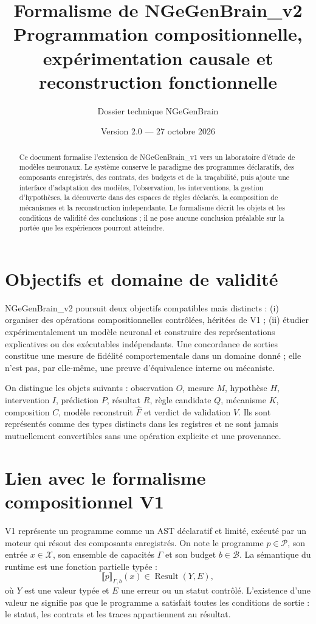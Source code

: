\documentclass[11pt,a4paper]{article}
\title{Formalisme de NGeGenBrain\_v2\\\large Programmation compositionnelle, expérimentation causale et reconstruction fonctionnelle}
\author{Dossier technique NGeGenBrain}
\date{Version 2.0 --- 27 octobre 2026}
\begin{document}
\maketitle
\begin{abstract}
Ce document formalise l'extension de NGeGenBrain\_v1 vers un laboratoire d'étude de modèles neuronaux. Le système conserve le paradigme des programmes déclaratifs, des composants enregistrés, des contrats, des budgets et de la traçabilité, puis ajoute une interface d'adaptation des modèles, l'observation, les interventions, la gestion d'hypothèses, la découverte dans des espaces de règles déclarés, la composition de mécanismes et la reconstruction independante. Le formalisme décrit les objets et les conditions de validité des conclusions ; il ne pose aucune conclusion préalable sur la portée que les expériences pourront atteindre.
\end{abstract}
\begingroup\footnotesize\setlength{\parskip}{0pt}\tableofcontents\endgroup
\newpage

\section{Objectifs et domaine de validité}
NGeGenBrain\_v2 poursuit deux objectifs compatibles mais distincts : (i) organiser des opérations compositionnelles contrôlées, héritées de V1 ; (ii) étudier expérimentalement un modèle neuronal et construire des représentations explicatives ou des exécutables indépendants. Une concordance de sorties constitue une mesure de fidélité comportementale dans un domaine donné ; elle n'est pas, par elle-même, une preuve d'équivalence interne ou mécaniste.

On distingue les objets suivants : observation $O$, mesure $M$, hypothèse $H$, intervention $I$, prédiction $P$, résultat $R$, règle candidate $Q$, mécanisme $K$, composition $C$, modèle reconstruit $\widehat{F}$ et verdict de validation $V$. Ils sont représentés comme des types distincts dans les registres et ne sont jamais mutuellement convertibles sans une opération explicite et une provenance.

\section{Lien avec le formalisme compositionnel V1}
V1 représente un programme comme un AST déclaratif et limité, exécuté par un moteur qui résout des composants enregistrés. On note le programme $p\in\mathcal{P}$, son entrée $x\in\mathcal{X}$, son ensemble de capacités $\Gamma$ et son budget $b\in\mathcal{B}$. La sémantique du runtime est une fonction partielle typée :
\[
\llbracket p\rrbracket_{\Gamma,b}(x)\in \operatorname{Result}(Y, E),
\]
où $Y$ est une valeur typée et $E$ une erreur ou un statut contrôlé. L'existence d'une valeur ne signifie pas que le programme a satisfait toutes les conditions de sortie : le statut, les contrats et les traces appartiennent au résultat.
\end{document}
